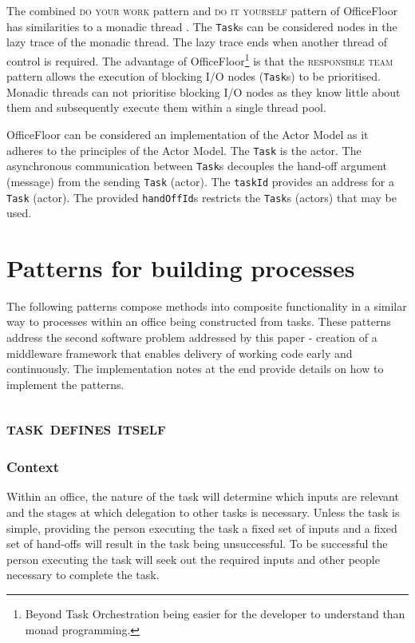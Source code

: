 \documentclass[prodmode]{style/acmlarge}
\begin{document}
The combined \textsc{do your work} pattern and \textsc{do it yourself} pattern
of OfficeFloor has similarities to a monadic thread \cite{monadic-thread}.  The
\texttt{Task}s can be considered nodes in the lazy trace of the monadic thread. 
The lazy trace ends when another thread of control is required.  The advantage of
OfficeFloor\footnote{Beyond Task Orchestration being easier for the developer to
understand than monad programming.} is that the \textsc{responsible team}
pattern allows the execution of blocking I/O nodes (\texttt{Task}s) to be
prioritised.  Monadic threads can not prioritise blocking I/O nodes as they know
little about them and subsequently execute them within a single thread pool.

OfficeFloor can be considered an implementation of the Actor Model \cite{actors}
as it adheres to the principles of the Actor Model.  The \texttt{Task} is the
actor.  The asynchronous communication between \texttt{Task}s decouples the
hand-off argument (message) from the sending \texttt{Task} (actor).  The
\texttt{taskId} provides an address for a \texttt{Task} (actor).  The provided
\texttt{handOffId}s restricts the \texttt{Task}s (actors) that may be used.




\section{Patterns for building processes}

The following patterns compose methods into composite functionality in a similar
way to processes within an office being constructed from tasks.  These patterns
address the second software problem addressed by this paper - creation of a
middleware framework that enables delivery of working code early and
continuously.  The implementation notes at the end provide details on how to
implement the patterns.


\subsection{\textsc{\textbf{task defines itself}}}

\subsubsection*{Context} Within an office, the nature of the task will determine
which inputs are relevant and the stages at which delegation to other tasks is
necessary.  Unless the task is simple, providing the person executing the task a
fixed set of inputs and a fixed set of hand-offs will result in the task being
unsuccessful.  To be successful the person executing the task will seek out the
required inputs and other people necessary to complete the task.
\end{document}
